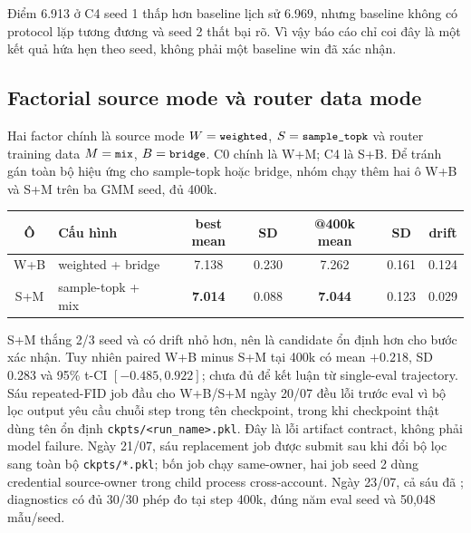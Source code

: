 \documentclass[11pt,a4paper]{article}
\newcommand{\run}[1]{{\small\nolinkurl{#1}}}
\newcommand{\metric}[1]{\texttt{\small\detokenize{#1}}}
\newcommand{\best}[1]{\textbf{#1}}
\begin{document}
Điểm 6.913 ở C4 seed 1 thấp hơn baseline lịch sử 6.969, nhưng baseline không có protocol lặp tương đương và seed 2 thất bại rõ. Vì vậy báo cáo chỉ coi đây là một kết quả hứa hẹn theo seed, không phải một baseline win đã xác nhận.

\subsection{Factorial source mode và router data mode}

Hai factor chính là source mode \(W=\metric{weighted}\), \(S=\metric{sample_topk}\) và router training data \(M=\metric{mix}\), \(B=\metric{bridge}\). C0 chính là W+M; C4 là S+B. Để tránh gán toàn bộ hiệu ứng cho sample-topk hoặc bridge, nhóm chạy thêm hai ô W+B và S+M trên ba GMM seed, đủ 400k.

\begin{center}
\small
\setlength{\tabcolsep}{4pt}
\begin{tabularx}{\linewidth}{@{}c Y c c c c c@{}}
\toprule
\textbf{Ô} & \textbf{Cấu hình} & \textbf{best mean} & \textbf{SD} & \textbf{@400k mean} & \textbf{SD} & \textbf{drift}\\
\midrule
W+B & weighted + bridge & 7.138 & 0.230 & 7.262 & 0.161 & 0.124\\
S+M & sample-topk + mix & \best{7.014} & 0.088 & \best{7.044} & 0.123 & 0.029\\
\bottomrule
\end{tabularx}
\end{center}

S+M thắng 2/3 seed và có drift nhỏ hơn, nên là candidate ổn định hơn cho bước xác nhận. Tuy nhiên paired W+B minus S+M tại 400k có mean \(+0.218\), SD 0.283 và 95\% t-CI \([-0.485,0.922]\); chưa đủ để kết luận từ single-eval trajectory. Sáu repeated-FID job đầu cho W+B/S+M ngày 20/07 đều lỗi trước eval vì bộ lọc output yêu cầu chuỗi step trong tên checkpoint, trong khi checkpoint thật dùng tên ổn định \run{ckpts/<run\_name>.pkl}. Đây là lỗi artifact contract, không phải model failure. Ngày 21/07, sáu replacement job được submit sau khi đổi bộ lọc sang toàn bộ \run{ckpts/*.pkl}; bốn job chạy same-owner, hai job seed 2 dùng credential source-owner trong child process cross-account. Ngày 23/07, cả sáu đã \metric{COMPLETE}; diagnostics có đủ 30/30 phép đo tại step 400k, đúng năm eval seed và 50,048 mẫu/seed.
\end{document}
